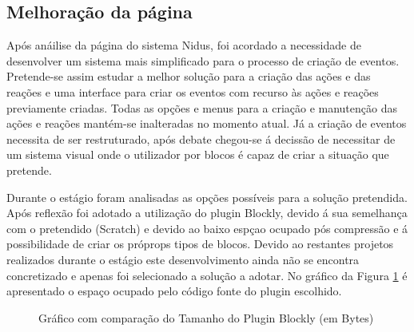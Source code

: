 \subsection{Melhoração da página}
\par Após anáilise da página do sistema Nidus, foi acordado a necessidade de desenvolver um sistema mais simplificado para o processo de criação de eventos. Pretende-se assim estudar a melhor solução para a criação das ações e das reações e uma interface para criar os eventos com recurso às ações e reações previamente criadas. Todas as opções e menus para a criação e manutenção das ações e reações mantém-se inalteradas no momento atual. Já a criação de eventos necessita de ser restruturado, após debate chegou-se á decissão de necessitar de um sistema visual onde o utilizador por blocos é capaz de criar a situação que pretende.
\par Durante o estágio foram analisadas as opções possíveis para a solução pretendida. Após reflexão foi adotado a utilização do plugin Blockly\cite{blockly}, devido á sua semelhança com o pretendido (Scratch) e devido ao baixo espçao ocupado pós compressão e á possibilidade de criar os próprops tipos de blocos. Devido ao restantes projetos realizados durante o estágio este desenvolvimento ainda não se encontra concretizado e apenas foi selecionado a solução a adotar. No gráfico da Figura \ref{block} é apresentado o espaço ocupado pelo código fonte do plugin escolhido.


\begin{figure}[ht]
\centering
{}

\caption{Gráfico com comparação do Tamanho do Plugin Blockly (em Bytes)}\label{block}


\end{figure}



